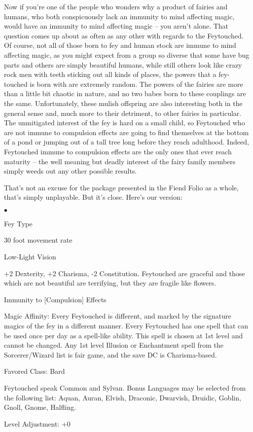 Now if you're one of the people who wonders why a product of fairies and humans, who both conspicuously lack an immunity to mind affecting magic, would have an immunity to mind affecting magic -- you aren't alone. That question comes up about as often as any other with regards to the Feytouched. Of course, not all of those born to fey and human stock are immune to mind affecting magic, as you might expect from a group so diverse that some have bug parts and others are simply beautiful humans, while still others look like crazy rock men with teeth sticking out all kinds of places, the powers that a fey-touched is born with are extremely random. The powers of the fairies are more than a little bit chaotic in nature, and no two babes born to these couplings are the same. Unfortunately, these mulish offspring are also interesting both in the general sense and, much more to their detriment, to other fairies in particular. The unmitigated interest of the fey is hard on a small child, so Feytouched who are not immune to compulsion effects are going to find themselves at the bottom of a pond or jumping out of a tall tree long before they reach adulthood. Indeed, Feytouched immune to compulsion effects are the only ones that ever reach maturity -- the well meaning but deadly interest of the fairy family members simply weeds out any other possible results.

That's not an excuse for the package presented in the Fiend Folio as a whole, that's simply unplayable. But it's close. Here's our version:

\begin{list}{$\bullet$}{\itemspace}
    \item Fey Type
    \item 30 foot movement rate
    \item Low-Light Vision
    \item +2 Dexterity, +2 Charisma, -2 Constitution. Feytouched are graceful and those which are not beautiful are terrifying, but they are fragile like flowers.
    \item Immunity to [Compulsion] Effects
    \item Magic Affinity: Every Feytouched is different, and marked by the signature magics of the fey in a different manner. Every Feytouched has one spell that can be used once per day as a spell-like ability. This spell is chosen at 1st level and cannot be changed. Any 1st level Illusion or Enchantment spell from the Sorcerer/Wizard list is fair game, and the save DC is Charisma-based.
    \item Favored Class: Bard
    \item Feytouched speak Common and Sylvan. Bonus Languages may be selected from the following list:
      Aquan, Auran, Elvish, Draconic, Dwarvish, Druidic, Goblin, Gnoll, Gnome, Halfling.
    \item Level Adjustment: +0
\end{list}

